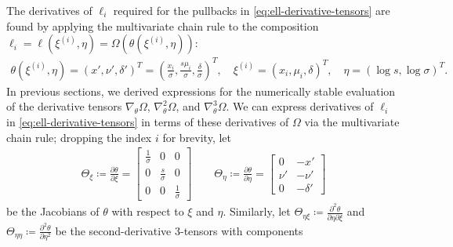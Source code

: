 \documentclass{article}
\begin{document}
The derivatives of $\ell_i$ required for the pullbacks in \cref{eq:ell-derivative-tensors} are found by applying the multivariate chain rule to the composition $\ell_i = \ell(\xi^{(i)}, \eta) = \Omega(\theta(\xi^{(i)}, \eta))$:
%
\begin{align}
  \theta(\xi^{(i)}, \eta) = (x', \nu', \delta')^T = \left(\frac{x_i}{\sigma}, \frac{s \mu_i}{\sigma}, \frac{\delta}{\sigma}\right)^T,
  \quad
  \xi^{(i)} = (x_i, \mu_i, \delta)^T,
  \quad
  \eta = (\log s, \log \sigma)^T. \label{eq:theta-transform}
\end{align}
%
In previous sections, we derived expressions for the numerically stable evaluation of the derivative tensors $\nabla_\theta \Omega$, $\nabla_\theta ^2\Omega$, and $\nabla_\theta ^3\Omega$.
We can express derivatives of $\ell_i$ in \cref{eq:ell-derivative-tensors} in terms of these derivatives of $\Omega$ via the multivariate chain rule;
dropping the index $i$ for brevity, let
%
\begin{align}
  \Theta_{\xi} \coloneqq \frac{\partial \theta}{\partial \xi} =
  \begin{bmatrix}
    \frac{1}{\sigma} & 0                & 0                \\
    0                & \frac{s}{\sigma} & 0                \\
    0                & 0                & \frac{1}{\sigma}
  \end{bmatrix}
  \qquad
  \Theta_{\eta} \coloneqq \frac{\partial \theta}{\partial \eta} =
  \begin{bmatrix}
    0    & -x'      \\
    \nu' & -\nu'    \\
    0    & -\delta'
  \end{bmatrix}
\end{align}
%
be the Jacobians of $\theta$ with respect to $\xi$ and $\eta$.
Similarly, let
$\Theta_{\eta\xi} \coloneqq \frac{\partial^2 \theta}{\partial \eta \partial \xi}$ and
$\Theta_{\eta\eta} \coloneqq \frac{\partial^2 \theta}{\partial \eta^2}$
be the second-derivative 3-tensors with components
%
\end{document}
